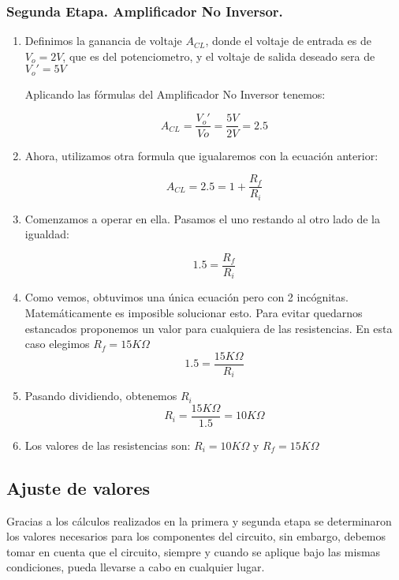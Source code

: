 \documentclass[12pt]{article}
\begin{document}
        \subsubsection{Segunda Etapa. Amplificador No Inversor.}
        \begin{enumerate}
        \item Definimos la ganancia de voltaje $A_{CL}$, donde el voltaje de entrada es de $V_{o}= 2 V$, que es del potenciometro, y el voltaje de salida deseado sera de $V_{o}'= 5 V$
        		
        		Aplicando las fórmulas del Amplificador No Inversor tenemos:

        				$$ A_{CL} = \frac{V_{o}'}{V{o}} = \frac{5 V}{2 V} = 2.5 $$
        				
        				
        	\item Ahora, utilizamos otra formula que igualaremos con la ecuación anterior:
        	
        	$$ A_{CL} =
        				2.5 = 1 + \frac{R_{f}}{R_{i}} $$
        				
            \item Comenzamos a operar en ella. Pasamos el uno restando al otro lado de la igualdad:
            
            $$ 1.5 = \frac{R_{f}}{R_{i}} $$
        	
        	\item Como vemos, obtuvimos una única ecuación pero con 2 incógnitas. Matemáticamente es imposible solucionar esto. Para evitar quedarnos estancados proponemos un valor para cualquiera de las resistencias. En esta caso elegimos $R_{f} = 15K\Omega$
        	\\
        	$$ 1.5 = \frac{15K\Omega}{R_{i}} $$
            
            \item Pasando dividiendo, obtenemos $R_{i}$
            \\
            $$ R_{i} = \frac{15K\Omega}{1.5} = 10K\Omega $$
            
            \item Los valores de las resistencias son: $R_{i} = 10K\Omega$ y $R_{f} = 15K\Omega$
        	
        	\end{enumerate}

        
        
		\subsection{Ajuste de valores}
        Gracias a los cálculos realizados en la primera y segunda etapa se determinaron los valores necesarios para los componentes del circuito, sin embargo, debemos tomar en cuenta que el circuito, siempre y cuando se aplique bajo las mismas condiciones, pueda llevarse a cabo en cualquier lugar. 
        
\end{document}
